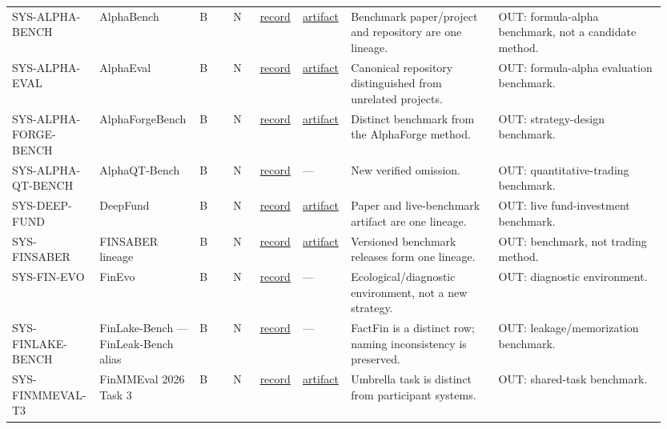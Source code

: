 \begin{longtable}{@{}L{0.12\linewidth}L{0.14\linewidth}L{0.05\linewidth}L{0.04\linewidth}L{0.06\linewidth}L{0.07\linewidth}L{0.22\linewidth}L{0.25\linewidth}@{}}
SYS-\allowbreak{}ALPHA-\allowbreak{}BENCH & AlphaBench & B & N & \href{https://alphabench.cc/}{record} & \href{https://github.com/CityU-MLO/AlphaBench}{artifact} & Benchmark paper/project and repository are one lineage. & OUT: formula-alpha benchmark, not a candidate method. \\
SYS-\allowbreak{}ALPHA-\allowbreak{}EVAL & AlphaEval & B & N & \href{https://arxiv.org/abs/2508.13174}{record} & \href{https://github.com/LeoDingggg/AlphaEval}{artifact} & Canonical repository distinguished from unrelated projects. & OUT: formula-alpha evaluation benchmark. \\
SYS-\allowbreak{}ALPHA-\allowbreak{}FORGE-\allowbreak{}BENCH & AlphaForgeBench & B & N & \href{https://arxiv.org/abs/2602.18481}{record} & \href{https://github.com/finbrain-lab-hkustgz/AlphaForgeBench}{artifact} & Distinct benchmark from the AlphaForge method. & OUT: strategy-design benchmark. \\
SYS-\allowbreak{}ALPHA-\allowbreak{}QT-\allowbreak{}BENCH & AlphaQT-Bench & B & N & \href{https://aclanthology.org/2026.findings-acl.138/}{record} & --- & New verified omission. & OUT: quantitative-trading benchmark. \\
SYS-\allowbreak{}DEEP-\allowbreak{}FUND & DeepFund & B & N & \href{https://arxiv.org/abs/2505.11065}{record} & \href{https://github.com/HKUSTDial/DeepFund}{artifact} & Paper and live-benchmark artifact are one lineage. & OUT: live fund-investment benchmark. \\
SYS-\allowbreak{}FINSABER & FINSABER lineage & B & N & \href{https://doi.org/10.1145/3770854.3785702}{record} & \href{https://github.com/waylonli/FINSABER}{artifact} & Versioned benchmark releases form one lineage. & OUT: benchmark, not trading method. \\
SYS-\allowbreak{}FIN-\allowbreak{}EVO & FinEvo & B & N & \href{https://arxiv.org/abs/2602.00948}{record} & --- & Ecological/diagnostic environment, not a new strategy. & OUT: diagnostic environment. \\
SYS-\allowbreak{}FINLAKE-\allowbreak{}BENCH & FinLake-Bench — FinLeak-Bench alias & B & N & \href{https://arxiv.org/abs/2510.07920}{record} & --- & FactFin is a distinct row; naming inconsistency is preserved. & OUT: leakage/memorization benchmark. \\
SYS-\allowbreak{}FINMMEVAL-\allowbreak{}T3 & FinMMEval 2026 Task 3 & B & N & \href{https://arxiv.org/abs/2602.10886}{record} & \href{https://mbzuai-nlp.github.io/CLEF-2026-FinMMEval-Lab/}{artifact} & Umbrella task is distinct from participant systems. & OUT: shared-task benchmark. \\

\end{longtable}
